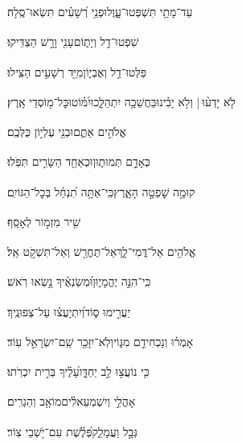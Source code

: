 \documentclass[12pt]{article}
\newcommand{\loc}[1]{\textsuperscript{\locf{#1}}}
\begin{document}
{\loc{ ב}~}‏עַד־מָתַ֥י תִּשְׁפְּטוּ־עָ֑וֶל{\hfill}וּפְנֵ֥י רְ֝שָׁעִ֗ים תִּשְׂאוּ־סֶֽלָה׃\par

{\loc{ ג}~}‏שִׁפְטוּ־דַ֥ל וְיָת֑וֹם{\hfill}עָנִ֖י וָרָ֣שׁ הַצְדִּֽיקוּ׃\par

{\loc{ ד}~}‏פַּלְּטוּ־דַ֥ל וְאֶבְי֑וֹן{\hfill}מִיַּ֖ד רְשָׁעִ֣ים הַצִּֽילוּ׃\par

{\loc{ ה}~}‏לֹ֤א יָדְע֨וּ |  וְלֹ֥א יָבִ֗ינוּ{\hfill}בַּחֲשֵׁכָ֥ה יִתְהַלָּ֑כוּ\newline\hspace*{.5em}יִ֝מּ֗וֹטוּ{\hfill}כׇּל־מ֥וֹסְדֵי אָֽרֶץ׃\par

{\loc{ ו}~}‏ אֱלֹהִ֣ים אַתֶּ֑ם{\hfill}וּבְנֵ֖י עֶלְי֣וֹן כֻּלְּכֶֽם׃\par

{\loc{ ז}~}‏ כְּאָדָ֣ם תְּמוּת֑וּן{\hfill}וּכְאַחַ֖ד הַשָּׂרִ֣ים תִּפֹּֽלוּ׃\par

{\loc{ ח}~}‏קוּמָ֣ה  שׇׁפְטָ֣ה הָאָ֑רֶץ{\hfill}כִּֽי־אַתָּ֥ה תִ֝נְחַ֗ל בְּכׇל־הַגּוֹיִֽם׃\par\pend
\ledpb
\pstart[\subsection*{\textcolor{red}{פרק פג}}]\label{פרק פג}
{\loc{ א}~}‏שִׁ֖יר מִזְמ֣וֹר לְאָסָֽף׃\par

{\loc{ ב}~}‏אֱלֹהִ֥ים אַל־דֳּמִי־לָ֑ךְ{\hfill}אַל־תֶּחֱרַ֖שׁ וְאַל־תִּשְׁקֹ֣ט אֵֽל׃\par

{\loc{ ג}~}‏כִּֽי־הִנֵּ֣ה  יֶהֱמָי֑וּן{\hfill}וּ֝מְשַׂנְאֶ֗יךָ נָ֣שְׂאוּ רֹֽאשׁ׃\par

{\loc{ ד}~}‏ יַעֲרִ֣ימוּ ס֑וֹד{\hfill}וְ֝יִתְיָעֲצ֗וּ עַל־צְפוּנֶֽיךָ׃\par

{\loc{ ה}~}‏אָמְר֗וּ  וְנַכְחִידֵ֣ם מִגּ֑וֹי{\hfill}וְלֹֽא־יִזָּכֵ֖ר שֵֽׁם־יִשְׂרָאֵ֣ל עֽוֹד׃\par

{\loc{ ו}~}‏כִּ֤י נוֹעֲצ֣וּ לֵ֣ב יַחְדָּ֑ו{\hfill}עָ֝לֶ֗יךָ בְּרִ֣ית יִכְרֹֽתוּ׃\par

{\loc{ ז}~}‏אָהֳלֵ֣י  וְיִשְׁמְעֵאלִ֗ים{\hfill}מוֹאָ֥ב וְהַגְרִֽים׃\par

{\loc{ ח}~}‏גְּבָ֣ל  וַעֲמָלֵ֑ק{\hfill}פְּ֝לֶ֗שֶׁת עִם־יֹ֥שְׁבֵי צֽוֹר׃\par
\end{document}
